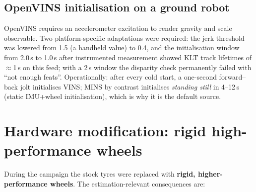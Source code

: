 \subsection{OpenVINS initialisation on a ground robot}
\label{sec:ovinit}
OpenVINS requires an accelerometer excitation to render gravity and scale
observable. Two platform-specific adaptations were required: the jerk
threshold was lowered from 1.5 (a handheld value) to 0.4, and the
initialisation window from 2.0\,s to 1.0\,s after instrumented measurement
showed KLT track lifetimes of $\approx$1\,s on this feed; with a 2\,s
window the disparity check permanently failed with ``not enough feats''.
Operationally: after every cold start, a one-second forward--back jolt
initialises VINS; MINS by contrast initialises \emph{standing still} in
4--12\,s (static IMU+wheel initialisation), which is why it is the default
source.

\section{Hardware modification: rigid high-performance wheels}
\label{sec:wheels}
During the campaign the stock tyres were replaced with \textbf{rigid,
higher-performance wheels}. The estimation-relevant consequences are:

